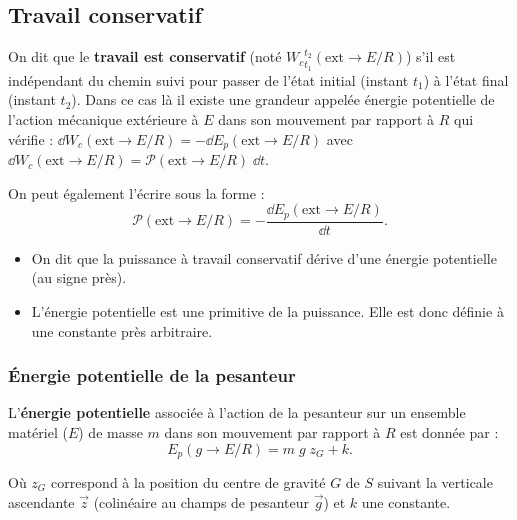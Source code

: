 \subsection{Travail conservatif}

\begin{defi}
On dit que le \textbf{travail est conservatif} (noté $\displaystyle{{W_c}^{t_2}_{t_1}}(\text{ext} \rightarrow E/R)$) s'il est indépendant du chemin suivi pour passer de l'état initial (instant $t_1$) à l'état final (instant $t_2$).
Dans ce cas là il existe une grandeur appelée énergie potentielle de l'action mécanique extérieure à $E$ dans son mouvement par rapport à $R$ qui vérifie :
$\dd W_c(\text{ext} \rightarrow E/R)=-\dd E_p(\text{ext} \rightarrow E/R)$ 
avec
$
\dd W_c(\text{ext} \rightarrow E/R)=\mathcal{P}(\text{ext} \rightarrow E/R)\;\dd t$.

On peut également l'écrire sous la forme :
$$
\mathcal{P}(\text{ext} \rightarrow E/R)=-\frac{\dd E_p(\text{ext} \rightarrow E/R)}{\dd t}.
$$
\end{defi}

\begin{remarque}%
\begin{itemize}
\item On dit que la puissance à travail conservatif dérive d'une énergie potentielle (au signe près).
\item L'énergie potentielle est une primitive de la puissance. Elle est donc définie à une constante près arbitraire.
\end{itemize}
\end{remarque}%

\subsubsection{Énergie potentielle de la pesanteur}

\begin{defi}
L'\textbf{énergie potentielle} associée à l'action de la pesanteur sur un ensemble matériel ($E$) de masse $m$ dans son mouvement par rapport à $R$ est donnée par :
$$
E_p(g \rightarrow E/R)=m\;g\;z_G + k.
$$

Où $z_G$ correspond à la position du centre de gravité $G$ de $S$ suivant la verticale ascendante $\overrightarrow{z}$ (colinéaire au champs de pesanteur $\overrightarrow{g}$) et $k$ une constante.

\end{defi}



